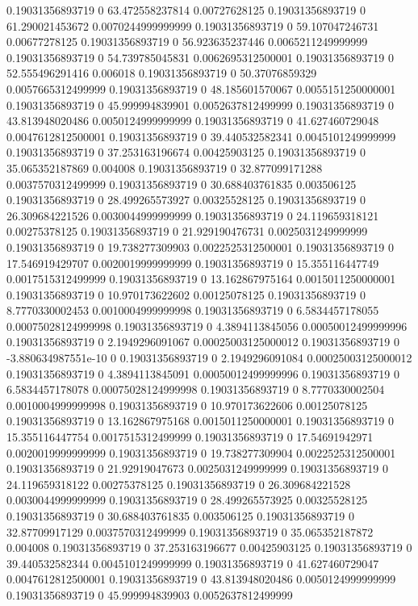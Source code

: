 0.19031356893719 0 63.472558237814 0.00727628125
0.19031356893719 0 61.290021453672 0.0070244999999999
0.19031356893719 0 59.107047246731 0.00677278125
0.19031356893719 0 56.923635237446 0.0065211249999999
0.19031356893719 0 54.739785045831 0.0062695312500001
0.19031356893719 0 52.555496291416 0.006018
0.19031356893719 0 50.37076859329 0.0057665312499999
0.19031356893719 0 48.185601570067 0.0055151250000001
0.19031356893719 0 45.999994839901 0.0052637812499999
0.19031356893719 0 43.813948020486 0.0050124999999999
0.19031356893719 0 41.627460729048 0.0047612812500001
0.19031356893719 0 39.440532582341 0.0045101249999999
0.19031356893719 0 37.253163196674 0.00425903125
0.19031356893719 0 35.065352187869 0.004008
0.19031356893719 0 32.877099171288 0.0037570312499999
0.19031356893719 0 30.688403761835 0.003506125
0.19031356893719 0 28.499265573927 0.00325528125
0.19031356893719 0 26.309684221526 0.0030044999999999
0.19031356893719 0 24.119659318121 0.00275378125
0.19031356893719 0 21.929190476731 0.0025031249999999
0.19031356893719 0 19.738277309903 0.0022525312500001
0.19031356893719 0 17.546919429707 0.0020019999999999
0.19031356893719 0 15.355116447749 0.0017515312499999
0.19031356893719 0 13.162867975164 0.0015011250000001
0.19031356893719 0 10.970173622602 0.00125078125
0.19031356893719 0 8.7770330002453 0.0010004999999998
0.19031356893719 0 6.5834457178055 0.00075028124999998
0.19031356893719 0 4.3894113845056 0.00050012499999996
0.19031356893719 0 2.1949296091067 0.00025003125000012
0.19031356893719 0 -3.880634987551e-10 0
0.19031356893719 0 2.1949296091084 0.00025003125000012
0.19031356893719 0 4.3894113845091 0.00050012499999996
0.19031356893719 0 6.5834457178078 0.00075028124999998
0.19031356893719 0 8.7770330002504 0.0010004999999998
0.19031356893719 0 10.970173622606 0.00125078125
0.19031356893719 0 13.162867975168 0.0015011250000001
0.19031356893719 0 15.355116447754 0.0017515312499999
0.19031356893719 0 17.54691942971 0.0020019999999999
0.19031356893719 0 19.738277309904 0.0022525312500001
0.19031356893719 0 21.92919047673 0.0025031249999999
0.19031356893719 0 24.119659318122 0.00275378125
0.19031356893719 0 26.309684221528 0.0030044999999999
0.19031356893719 0 28.499265573925 0.00325528125
0.19031356893719 0 30.688403761835 0.003506125
0.19031356893719 0 32.87709917129 0.0037570312499999
0.19031356893719 0 35.065352187872 0.004008
0.19031356893719 0 37.253163196677 0.00425903125
0.19031356893719 0 39.440532582344 0.0045101249999999
0.19031356893719 0 41.627460729047 0.0047612812500001
0.19031356893719 0 43.813948020486 0.0050124999999999
0.19031356893719 0 45.999994839903 0.0052637812499999
